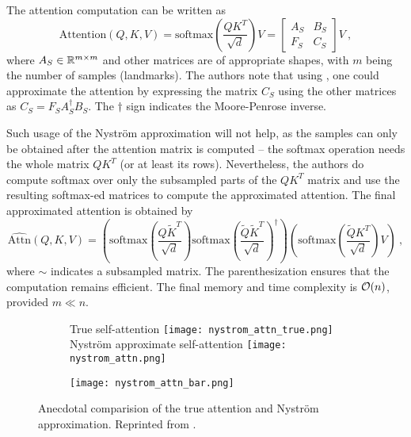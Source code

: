 The attention computation can be written as
\begin{equation}
        \text{Attention}(Q,K,V)=\text{softmax}\left(\frac{QK^T}{\sqrt{d}}\right)V=
        \begin{bmatrix}
                A_S & B_S \\
                F_S & C_S
        \end{bmatrix}V\ ,
\end{equation}
where $A_S\in\mathbb{R}^{m\times m}$ and other matrices are of appropriate shapes, with $m$ being the number of samples (landmarks). 
The authors note that using \citep{nystrom-matrix-approx}, one could approximate the attention by expressing the matrix $C_S$ using the other matrices as $C_S=F_SA_S^\dagger B_S$. The $\dagger$ sign indicates the Moore-Penrose inverse.

Such usage of the Nystr\"om approximation will not help, as the samples can only be obtained after the attention matrix is computed -- the softmax operation needs the whole matrix $QK^T$ (or at least its rows). 
Nevertheless, the authors do compute softmax over only the subsampled parts of the $QK^T$ matrix and use the resulting softmax-ed matrices to compute the approximated attention.
The final approximated attention is obtained by 
\begin{equation}
        \widehat{\text{Attn}}(Q,K,V)=
        \left(
        \text{softmax}\left(\frac{Q\tilde{K}^T}{\sqrt{d}}\right)
        \text{softmax}\left(\frac{\tilde{Q}\tilde{K}^T}{\sqrt{d}}\right)^\dagger
        \right)
        \left(
        \text{softmax}\left(\frac{\tilde{Q}K^T}{\sqrt{d}}\right)
        V
        \right)
        \ ,
\end{equation}
where $\sim$ indicates a subsampled matrix. The parenthesization ensures that the computation remains efficient. The final memory and time complexity is $\mathcal{O}(n)$, provided $m\ll n$.

\begin{figure}[!htb]
        \centering
        \hspace{.5cm}
        \begin{subfigure}{.7\textwidth}
                \begin{minipage}[c]{0.8\linewidth}
                \centering True self-attention
                \texttt{[image: nystrom\_attn\_true.png]}
                \centering Nystr\"{o}m approximate self-attention
                \texttt{[image: nystrom\_attn.png]}
        \end{minipage}
                \hfill
        \begin{minipage}[c]{0.12\linewidth}
                \centering 
                \texttt{[image: nystrom\_attn\_bar.png]}
        \end{minipage}
        \end{subfigure}
        \caption[\nystr{} Attention Example]{Anecdotal comparision of the true attention and Nystr\"om approximation. Reprinted from \citep{nystrom}.}
        \label{fig:nystrom_example}
\end{figure}

